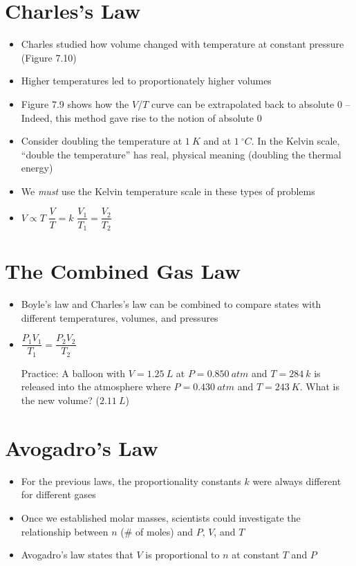 \documentclass[12pt, openany, letterpaper]{memoir}
\begin{document}
\section{Charles's Law}
\begin{itemize}
	\item Charles studied how volume changed with temperature at constant pressure (Figure 7.10)
	\item Higher temperatures led to proportionately higher volumes
	\item Figure 7.9 shows how the $V$/$T$ curve can be extrapolated back to absolute $0$ -- Indeed, this method gave rise to the notion of absolute $0$
	\item Consider doubling the temperature at $1~K$ and at $1~^\circ C$. In the Kelvin scale, ``double the temperature'' has real, physical meaning (doubling the thermal energy)
	\item We \emph{must} use the Kelvin temperature scale in these types of problems
	\item $V\propto T$ \hspace{2em} $\dfrac{V}{T} = k$ \hspace{2em} $\dfrac{V_1}{T_1}=\dfrac{V_2}{T_2}$

\end{itemize}
\section{The Combined Gas Law}
\begin{itemize}
	\item Boyle's law and Charles's law can be combined to compare states with different temperatures, volumes, and pressures
	\item $\dfrac{P_1V_1}{T_1}=\dfrac{P_2V_2}{T_2}$

	      Practice: A balloon with $V=1.25~L$ at $P=0.850~atm$ and $T=284~k$ is released into the atmosphere where $P=0.430~atm$ and $T=243~K$. What is the new volume? ($2.11~L$)
\end{itemize}
\section{Avogadro's Law}
\begin{itemize}
	\item For the previous laws, the proportionality constants $k$ were always different for different gases
	\item Once we established molar masses, scientists could investigate the relationship between $n$ (\# of moles) and $P$, $V$, and $T$
	\item Avogadro's law states that $V$ is proportional to $n$ at constant $T$ and $P$
\end{itemize}
\end{document}
